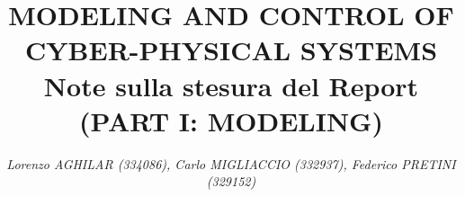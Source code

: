 \documentclass[a4paper,11pt]{article}
\begin{document}
    
    \title{
        \linespread{0.7}
        \vspace{-2.5cm}
        \textbf{
        {\large{MODELING AND CONTROL OF CYBER-PHYSICAL SYSTEMS}}\\
        {\Large{Note sulla stesura del Report}}
        \small{(PART I: MODELING)}
        }
    }
    
    \author{
        \textit{ 
        Lorenzo AGHILAR (334086),
        Carlo MIGLIACCIO (332937), 
        Federico PRETINI (329152)}
    }
    \date{}
    \clearpage\maketitle
    \thispagestyle{empty}

    
\end{document}
